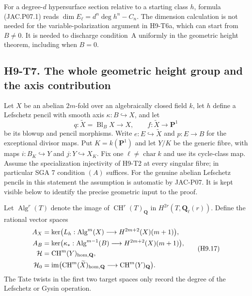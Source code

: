 \documentclass[11pt,a4paper]{article}
\begin{document}
For a degree-$d$ hypersurface section relative to a starting class
$h$, formula (JAC.P07.1) reads
$\dim E_\ell=d^n\deg h^n-C_n$.  The dimension calculation is not
needed for the variable-polarization argument in H9-T6a, which can
start from $B\ne0$.  It is needed to discharge condition~A uniformly
in the geometric height theorem, including when $B=0$.



\subsection*{H9-T7. The whole geometric height group and the axis contribution}

Let $X$ be an abelian $2m$-fold over an algebraically closed field $k$,
let $h$ define a Lefschetz pencil with smooth axis
$\kappa:B\hookrightarrow X$, and let
\[
 q:\widetilde X=\operatorname{Bl}_B X\longrightarrow X,
 \qquad f:\widetilde X\longrightarrow\mathbf P^1
\]
be its blowup and pencil morphisms. Write $e:E\hookrightarrow\widetilde X$
and $p:E\to B$ for the exceptional divisor maps. Put $K=k(\mathbf P^1)$
and let $Y/K$ be the generic fibre, with maps
$i:B_K\hookrightarrow Y$ and $j:Y\hookrightarrow X_K$.
Fix one $\ell\ne\operatorname{char}k$ and use its cycle-class map.
Assume the specialization injectivity of H9-T2 at every singular fibre;
in particular SGA 7 condition $(A)$ suffices.
For the genuine abelian Lefschetz pencils in this statement the
assumption is automatic by JAC-P07. It is kept visible below to
identify the precise geometric input to the proof.

Let $\operatorname{Alg}^r(T)$ denote the image of $\operatorname{CH}^r(T)_{\mathbf Q}$
in $H^{2r}(T,\mathbf Q_\ell(r))$. Define the rational vector spaces
\[
 \begin{split}
 A_X&=\ker\bigl(L_h:\operatorname{Alg}^m(X)\longrightarrow H^{2m+2}(X)(m+1)\bigr),\\
 A_B&=\ker\bigl(\kappa_*:\operatorname{Alg}^{m-1}(B)
                       \longrightarrow H^{2m+2}(X)(m+1)\bigr),\\
 \mathcal H&=\operatorname{CH}^m(Y)_{\rm hom,\mathbf Q},\\
 \mathcal H_0&=\operatorname{im}\bigl(
       \operatorname{CH}^m(\widetilde X)_{\rm hom,\mathbf Q}
           \longrightarrow\operatorname{CH}^m(Y)_{\mathbf Q}\bigr).
 \end{split}                                                   \tag{H9.17}
\]
The Tate twists in the first two target spaces only record the degree of
the Lefschetz or Gysin operation.
\end{document}
